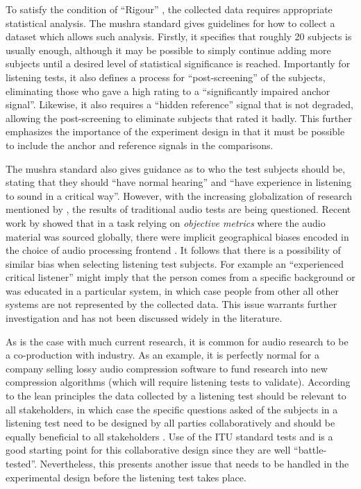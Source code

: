 \documentclass{article}
\begin{document}
To satisfy the condition of \enquote{Rigour} \cite{hoffeckerLeanResearchFrameworkAgust2015}, the collected data requires appropriate statistical analysis. The \gls{mushra} standard \cite{itu-r-bs-1534_MUSHRA} gives guidelines for how to collect a dataset which allows such analysis. Firstly, it specifies that roughly 20 subjects is usually enough, although it may be possible to simply continue adding more subjects until a desired level of statistical significance is reached. Importantly for listening tests, it also defines a process for \enquote{post-screening} of the subjects, eliminating those who gave a high rating to a \enquote{significantly impaired anchor signal}. Likewise, it also requires a \enquote{hidden reference} signal that is not degraded, allowing the post-screening to eliminate subjects that rated it badly. This further emphasizes the importance of the experiment design in that it must be possible to include the anchor and reference signals in the comparisons.

The \gls{mushra} standard \cite{itu-r-bs-1534_MUSHRA} also gives guidance as to who the test subjects should be, stating that they should \enquote{have normal hearing} and \enquote{have experience in listening to sound in a critical way}. However, with the increasing globalization of research mentioned by \citeauthor{mustajokiNewApproachResearch2017} \cite{mustajokiNewApproachResearch2017}, the results of traditional audio tests are being questioned. Recent work by \citeauthor{chauhanCrossCulturalBiasMelScale2026} showed that in a task relying on \textit{objective metrics} where the audio material was sourced globally, there were implicit geographical biases encoded in the choice of audio processing frontend \cite{chauhanCrossCulturalBiasMelScale2026}. It follows that there is a possibility of similar bias when selecting listening test subjects. For example an \enquote{experienced critical listener} might imply that the person comes from a specific background or was educated in a particular system, in which case people from other all other systems are not represented by the collected data. This issue warrants further investigation and has not been discussed widely in the literature.

As is the case with much current research, it is common for audio research to be a co-production with industry. As an example, it is perfectly normal for a company selling lossy audio compression software to fund research into new compression algorithms (which will require listening tests to validate). According to the lean principles \cite{hoffeckerLeanResearchFrameworkAgust2015} the data collected by a listening test should be relevant to all stakeholders, in which case the specific questions asked of the subjects in a listening test need to be designed by all parties collaboratively and should be equally beneficial to all stakeholders \cite{pageEthicsCoproductionKnowledge2022}. Use of the ITU standard tests and is a good starting point for this collaborative design since they are well \enquote{battle-tested}. Nevertheless, this presents another issue that needs to be handled in the experimental design before the listening test takes place.
\end{document}
